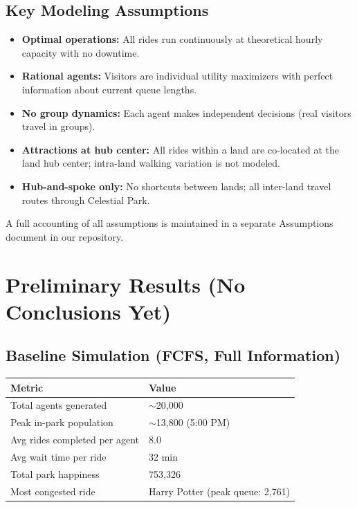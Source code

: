 \documentclass[11pt]{article}
\begin{document}
\subsection{Key Modeling Assumptions}

\begin{itemize}[nosep]
    \item \textbf{Optimal operations:} All rides run continuously at theoretical hourly capacity with no downtime.
    \item \textbf{Rational agents:} Visitors are individual utility maximizers with perfect information about current queue lengths.
    \item \textbf{No group dynamics:} Each agent makes independent decisions (real visitors travel in groups).
    \item \textbf{Attractions at hub center:} All rides within a land are co-located at the land hub center; intra-land walking variation is not modeled.
    \item \textbf{Hub-and-spoke only:} No shortcuts between lands; all inter-land travel routes through Celestial Park.
\end{itemize}

A full accounting of all assumptions is maintained in a separate Assumptions document in our repository.

\section{Preliminary Results (No Conclusions Yet)}

\subsection{Baseline Simulation (FCFS, Full Information)}

\begin{table}[H]
\centering
\begin{tabular}{ll}
\toprule
\textbf{Metric} & \textbf{Value} \\
\midrule
Total agents generated & $\sim$20,000 \\
Peak in-park population & $\sim$13,800 (5:00 PM) \\
Avg rides completed per agent & 8.0 \\
Avg wait time per ride & 32 min \\
Total park happiness & 753,326 \\
Most congested ride & Harry Potter (peak queue: 2,761) \\
\bottomrule
\end{tabular}
\end{table}
\end{document}
